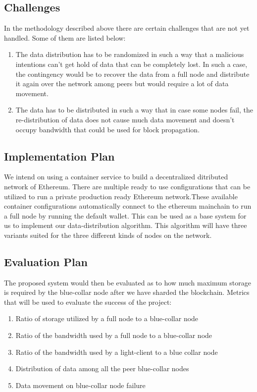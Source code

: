\documentclass[conference]{IEEEtran}
\begin{document}
\subsection{Challenges}
In the methodology described above there are certain challenges that are not yet
handled. Some of them are listed below:

\begin{enumerate}
    \item The data distribution has to be randomized in such a way that a
        malicious intentions can't get hold of data that can be completely lost.
        In such a case, the contingency would be to recover the data from a full
        node and distribute it again over the network among peers but would
        require a lot of data movement.
    \item The data has to be distributed in such a way that in case some nodes
        fail, the re-distribution of data does not cause much data movement and
        doesn't occupy bandwidth that could be used for block propagation.
\end{enumerate}

\subsection{Implementation Plan}
We intend on using a container service to build a decentralized ditributed
network of Ethereum. There are multiple ready to use configurations that can be
utilized to run a private production ready Ethereum network.These available
container configurations automatically connect to the ethereum mainchain to run
a full node by running the default wallet. 
This can be used as a base system for us to implement our data-distribution
algorithm. This algorithm will have three variants suited for the three
different kinds of nodes on the network. 

\subsection{Evaluation Plan}
The proposed system would then be evaluated as to how much maximum storage is
required by the blue-collar node after we have sharded the blockchain. 
Metrics that will be used to evaluate the success of the project:
\begin{enumerate}
    \item Ratio of storage utilized by a full node to a blue-collar node
    \item Ratio of the bandwidth used by a full node to a blue-collar node
    \item Ratio of the bandwidth used by a light-client to a blue collar node
    \item Distribution of data among all the peer blue-collar nodes
    \item Data movement on blue-collar node failure
\end{enumerate}
\end{document}
